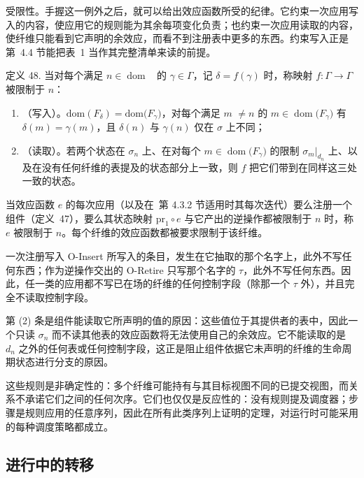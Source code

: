 \documentclass[
  10
]{article}
\begin{document}
受限性。手握这一例外之后，就可以给出效应函数所受的纪律。它约束一次应用写入的内容，使应用它的规则能为其余每项变化负责；也约束一次应用读取的内容，使纤维只能看到它声明的余效应，而看不到注册表中更多的东西。约束写入正是第~4.4 节能把表~1 当作其完整清单来读的前提。

定义 48. 当对每个满足 \(n \in \mathop { \mathrm { d o m } } \mathop { \left( F _ { \gamma } \right) }\) 的 \(\gamma \in \Gamma\)，记 \(\delta = f ( \gamma )\) 时，称映射 \(f : \Gamma \to \Gamma\) 被限制于 $n$：

\begin{enumerate}
\def\labelenumi{\arabic{enumi}.}
\item
  （写入）。\(\mathrm { d o m } ( F _ { \delta } ) = \mathrm { d o m } \big ( F _ { \gamma } \big )\)，对每个满足 $m$ \(\neq n\) 的 \(m \in \mathop { \mathrm { d o m } } \bigl ( F _ { \gamma } \bigr )\) 有 \(\delta ( m ) = \gamma ( m )\)，且 \(\delta ( n )\) 与 \(\gamma ( n )\) 仅在 $\sigma$ 上不同；
\item
  （读取）。若两个状态在 \(\sigma _ { n }\) 上、在对每个 \(m \in \mathop { \mathrm { d o m } } \bigl ( F _ { \gamma } \bigr )\) 的限制 \(\sigma _ { m } | _ { d _ { n } }\) 上、以及在没有任何纤维的表提及的状态部分上一致，则 $f$ 把它们带到在同样这三处一致的状态。
\end{enumerate}

当效应函数 $e$ 的每次应用（以及在~第 4.3.2 节适用时其每次迭代）要么注册一个组件（定义~47），要么其状态映射 \(\mathrm { p r } _ { 1 } \circ e\) 与它产出的逆操作都被限制于 $n$ 时，称 $e$ 被限制于 $n$。每个纤维的效应函数都被要求限制于该纤维。

一次注册写入 O-Insert 所写入的条目，发生在它抽取的那个名字上，此外不写任何东西；作为逆操作交出的 O-Retire 只写那个名字的 \(\tau\)，此外不写任何东西。因此，任一类的应用都不写已在场的纤维的任何控制字段（除那一个 \(\tau\) 外），并且完全不读取控制字段。

第 (2) 条是组件能读取它所声明的值的原因：这些值位于其提供者的表中，因此一个只读 \(\sigma _ { n }\) 而不读其他表的效应函数将无法使用自己的余效应。它不能读取的是 \(d _ { n }\) 之外的任何表或任何控制字段，这正是阻止组件依据它未声明的纤维的生命周期状态进行分支的原因。

这些规则是非确定性的：多个纤维可能持有与其目标视图不同的已提交视图，而关系不承诺它们之间的任何次序。它们也仅仅是反应性的：没有规则提及调度器；步骤是规则应用的任意序列，因此在所有此类序列上证明的定理，对运行时可能采用的每种调度策略都成立。
\subsection{进行中的转移} \label{transitions-in-progress}
\end{document}
